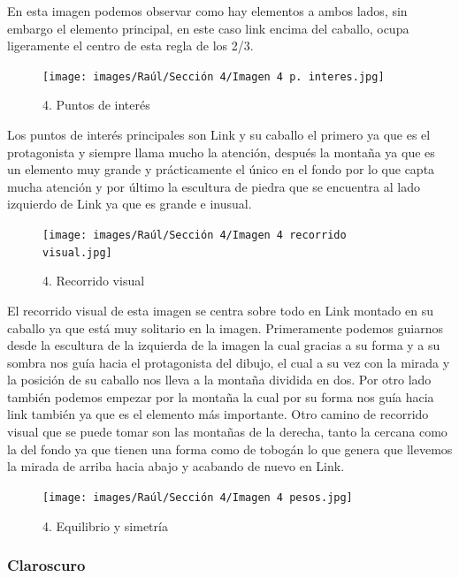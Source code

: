 \documentclass[12pt]{article}
\begin{document}
En esta imagen podemos observar como hay elementos a ambos lados, sin embargo el elemento principal, en este caso link encima del caballo, ocupa ligeramente el centro de esta regla de los 2/3.

\begin{figure}[H]
      \centering
      \texttt{[image: images/Raúl/Sección 4/Imagen 4 p. interes.jpg]}
      \caption{\small 4. Puntos de interés}
\end{figure}  

Los puntos de interés principales son Link y su caballo el primero ya que es el protagonista y siempre llama mucho la atención, después la montaña ya que es un elemento muy grande y prácticamente el único en el fondo por lo que capta mucha atención y por último la escultura de piedra que se encuentra al lado izquierdo de Link ya que es grande e inusual.

\begin{figure}[H]
      \centering
      \texttt{[image: images/Raúl/Sección 4/Imagen 4 recorrido visual.jpg]}
      \caption{\small 4. Recorrido visual}
\end{figure}  

El recorrido visual de esta imagen se centra sobre todo en Link montado en su caballo ya que está muy solitario en la imagen. Primeramente podemos guiarnos desde la escultura de la izquierda de la imagen la cual gracias a su forma y a su sombra nos guía hacia el protagonista del dibujo, el cual a su vez con la mirada y la posición de su caballo nos lleva a la montaña dividida en dos. Por otro lado también podemos empezar por la montaña la cual por su forma nos guía hacia link también ya que es el elemento más importante. Otro camino de recorrido visual que se puede tomar son las montañas de la derecha, tanto la cercana como la del fondo ya que tienen una forma como de tobogán lo que genera que llevemos la mirada de arriba hacia abajo y acabando de nuevo en Link.

\begin{figure}[H]
      \centering
      \texttt{[image: images/Raúl/Sección 4/Imagen 4 pesos.jpg]}
      \caption{\small 4. Equilibrio y simetría}
\end{figure} 

        \subsubsection{Claroscuro}
\end{document}
